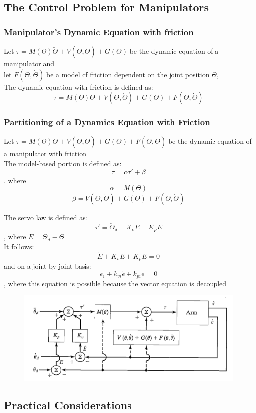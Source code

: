 \documentclass[10pt,a4paper]{article}
\begin{document}
\subsection{The Control Problem for Manipulators}
\subsubsection{Manipulator's Dynamic Equation with friction}
Let $\tau = M(\Theta)\ddot{\Theta} + V(\Theta, \dot{\Theta}) + G(\Theta)$ be the dynamic equation of a manipulator and \\
let $F(\Theta, \dot \Theta)$ be a model of friction dependent on the joint position $\Theta$, \\
The dynamic equation with friction is defined as:
$$
	\tau = M(\Theta)\ddot{\Theta} + V(\Theta, \dot{\Theta}) + G(\Theta) + F(\Theta, \dot \Theta)
$$

\subsubsection{Partitioning of a Dynamics Equation with Friction}
Let $\tau = M(\Theta)\ddot{\Theta} + V(\Theta, \dot{\Theta}) + G(\Theta) + F(\Theta, \dot \Theta)$ be the dynamic equation of a manipulator with friction \\
The model-based portion is defined as:
$$
	\tau = \alpha \tau' + \beta
$$
, where
$$
	\alpha = M(\Theta)
$$
$$
	\beta = V(\Theta, \dot \Theta) + G(\Theta) + F(\Theta, \dot \Theta)
$$

The servo law is defined as:
$$
	\tau' = \ddot \Theta_d + K_v \dot E + K_p E
$$
, where $E = \Theta_d - \Theta$
\\

It follows:
$$
	\ddot E + K_v \dot E + K_p E = 0
$$
and on a joint-by-joint basis:
$$
	\ddot e_i + k_{vi}\dot e + k_{pi} e = 0
$$
, where this equation is possible because the vector equation is decoupled

\begin{figure}[H]
	\includegraphics[width=0.5\columnwidth]{imgs/trajectory_following_dynamics.png}
\end{figure}

\subsection{Practical Considerations}
\end{document}
